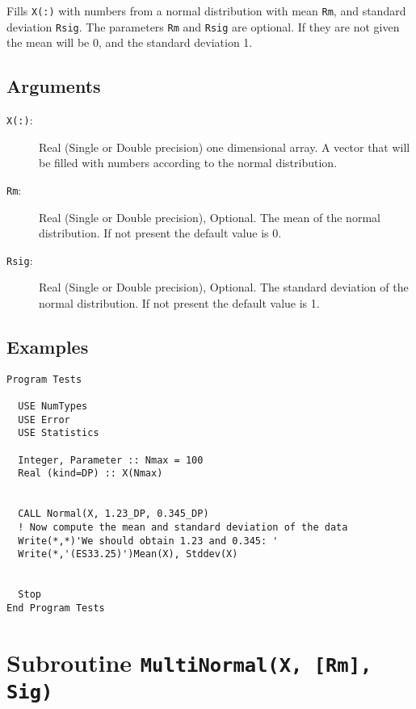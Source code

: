 Fills \texttt{X(:)} with numbers from a normal distribution with mean
\texttt{Rm}, and standard deviation \texttt{Rsig}. The parameters
\texttt{Rm} and \texttt{Rsig} are optional. If they are not given the
mean will be 0, and the standard deviation 1.

\subsection{Arguments}

\begin{description}
\item[\texttt{X(:)}:] Real (Single or Double precision) one
  dimensional array. A vector that will be filled with numbers
  according to the normal distribution.
\item[\texttt{Rm}:] Real (Single or Double precision), Optional. The
  mean of the normal distribution. If not present the default value
  is 0.
\item[\texttt{Rsig}:] Real (Single or Double precision), Optional. The
  standard deviation of the normal distribution.  If not present the
  default value is 1. 
\end{description}

\subsection{Examples}

\begin{lstlisting}[emph=Normal,
                   emphstyle=\color{blue},
                   frame=trBL,
                   caption=Obtaining numbers with a normal distribution.,
                   label=normal]
Program Tests

  USE NumTypes
  USE Error
  USE Statistics

  Integer, Parameter :: Nmax = 100
  Real (kind=DP) :: X(Nmax)


  CALL Normal(X, 1.23_DP, 0.345_DP)
  ! Now compute the mean and standard deviation of the data
  Write(*,*)'We should obtain 1.23 and 0.345: '
  Write(*,'(ES33.25)')Mean(X), Stddev(X)


  Stop
End Program Tests
\end{lstlisting}

\section{Subroutine \texttt{MultiNormal(X, [Rm], Sig)}}

